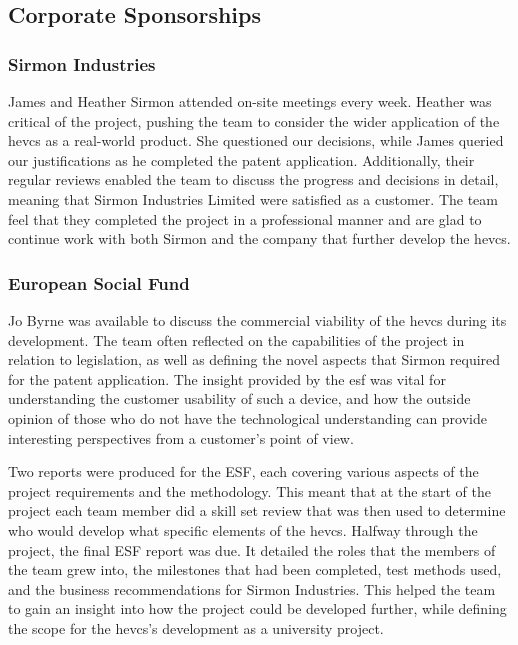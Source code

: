 \documentclass [12pt]{article}
\begin{document}
\subsection{Corporate Sponsorships}

\subsubsection{Sirmon Industries}
James and Heather Sirmon attended on-site meetings every week. Heather was critical of the project, pushing the team to consider the wider application of the \gls{hevcs} as a real-world product. She questioned our decisions, while James queried our justifications as he completed the patent application. Additionally, their regular reviews enabled the team to discuss the progress and decisions in detail, meaning that Sirmon Industries Limited were satisfied as a customer. The team feel that they completed the project in a professional manner and are glad to continue work with both Sirmon and the company that further develop the \gls{hevcs}.

\subsubsection{European Social Fund}
Jo Byrne was available to discuss the commercial viability of the \gls{hevcs} during its development. The team often reflected on the capabilities of the project in relation to legislation, as well as defining the novel aspects that Sirmon required for the patent application. The insight provided by the \gls{esf} was vital for understanding the customer usability of such a device, and how the outside opinion of those who do not have the technological understanding can provide interesting perspectives from a customer’s point of view.

Two reports were produced for the ESF, each covering various aspects of the project requirements and the methodology. This meant that at the start of the project each team member did a skill set review that was then used to determine who would develop what specific elements of the \gls{hevcs}. Halfway through the project, the final ESF report was due. It detailed the roles that the members of the team grew into, the milestones that had been completed, test methods used, and the business recommendations for Sirmon Industries. This helped the team to gain an insight into how the project could be developed further, while defining the scope for the \gls{hevcs}’s development as a university project.
\end{document}
